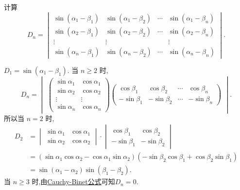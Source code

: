 \documentclass[../../main.tex]{subfiles}%
\begin{document}
\begin{example}
计算
\[
D_n = \begin{vmatrix} \sin(\alpha_1 - \beta_1) & \sin(\alpha_1 - \beta_2) & \cdots & \sin(\alpha_1 - \beta_n) \\ \sin(\alpha_2 - \beta_1) & \sin(\alpha_2 - \beta_2) & \cdots & \sin(\alpha_2 - \beta_n) \\ \vdots & \vdots & & \vdots \\ \sin(\alpha_n - \beta_1) & \sin(\alpha_n - \beta_2) & \cdots & \sin(\alpha_n - \beta_n) \end{vmatrix}.
\]
\end{example}
\begin{solution}

\(D_1 = \sin(\alpha_1 - \beta_1)\). 当 \(n \geqslant 2\) 时,
\[
D_n = \begin{vmatrix} \begin{pmatrix} \sin \alpha_1 & \cos \alpha_1 \\ \sin \alpha_2 & \cos \alpha_2 \\ \vdots & \vdots \\ \sin \alpha_n & \cos \alpha_n \end{pmatrix} \begin{pmatrix} \cos \beta_1 & \cos \beta_2 & \cdots & \cos \beta_n \\ -\sin \beta_1 & -\sin \beta_2 & \cdots & -\sin \beta_n \end{pmatrix} \end{vmatrix}.
\]
所以当 \(n = 2\) 时,
\[
\begin{aligned}
D_2 &= \begin{vmatrix} \sin \alpha_1 & \cos \alpha_1 \\ \sin \alpha_2 & \cos \alpha_2 \end{vmatrix} \cdot \begin{vmatrix} \cos \beta_1 & \cos \beta_2 \\ -\sin \beta_1 & -\sin \beta_2 \end{vmatrix} \\
&= (\sin \alpha_1 \cos \alpha_2 - \cos \alpha_1 \sin \alpha_2)(-\sin \beta_2 \cos \beta_1 + \cos \beta_2 \sin \beta_1) \\
&= \sin(\alpha_1 - \alpha_2) \sin(\beta_1 - \beta_2).
\end{aligned}
\]
当 \(n \geqslant 3\) 时,由\hyperref[theorem:Cauchy-Binet公式]{Cauchy-Binet公式}可知$D_n=0.$

\end{solution}
\end{document}
